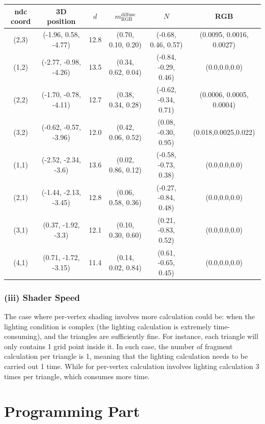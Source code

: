 \documentclass[11pt]{article}
\begin{document}
\begin{center}
    \begin{tabular}{ c c c c c c } 
    \hline
    ndc coord & 3D position & $d$ & $m_\text{RGB}^\text{diffuse}$ & $N$ & RGB \\[4pt] 
    \hline
    (2,3) & (-1.96, 0.58, -4.77) & 12.8 & (0.70, 0.10, 0.20) & (-0.68, 0.46, 0.57) &    (0.0095, 0.0016, 0.0027) \\ 
    (1,2) & (-2.77, -0.98, -4.26) & 13.5 & (0.34, 0.62, 0.04) & (-0.84, -0.29, 0.46) &  (0.0,0.0,0.0) \\ 
    (2,2) & (-1.70, -0.78, -4.11) & 12.7 & (0.38, 0.34, 0.28) & (-0.62, -0.34, 0.71) &  (0.0006, 0.0005, 0.0004) \\ 
    (3,2) & (-0.62, -0.57, -3.96) & 12.0 & (0.42, 0.06, 0.52) & (0.08, -0.30, 0.95) &   (0.018,0.0025,0.022) \\
    (1,1) & (-2.52, -2.34, -3.6) & 13.6 & (0.02, 0.86, 0.12) & (-0.58, -0.73, 0.38) &   (0.0,0.0,0.0) \\
    (2,1) & (-1.44, -2.13, -3.45) & 12.8 & (0.06, 0.58, 0.36) & (-0.27, -0.84, 0.48) &  (0.0,0.0,0.0) \\
    (3,1) & (0.37, -1.92, -3.3) & 12.1 & (0.10, 0.30, 0.60) & (0.21, -0.83, 0.52) &     (0.0,0.0,0.0) \\
    (4,1) & (0.71, -1.72, -3.15) & 11.4 & (0.14, 0.02, 0.84) & (0.61, -0.65, 0.45) &    (0.0,0.0,0.0) \\
    \hline
    \end{tabular}
\end{center}


\subsubsection*{(iii) Shader Speed}
The case where per-vertex shading involves more calculation could be: when the lighting condition is complex (the lighting calculation is extremely time-consuming), and the triangles are sufficiently fine. For instance, each triangle will only contains 1 grid point inside it. In such case, the number of fragment calculation per triangle is 1, meaning that the lighting calculation needs to be carried out 1 time. While for per-vertex calculation involves lighting calculation 3 times per triangle, which consumes more time.

\newpage

\section{Programming Part}
\end{document}
